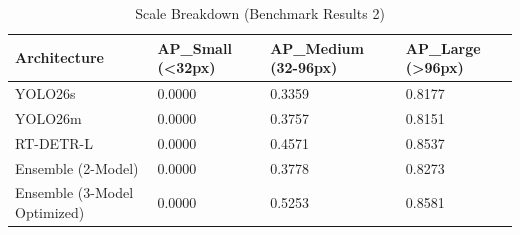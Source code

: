 \begin{table}
\caption{Scale Breakdown (Benchmark Results 2)}
\label{tab:scale_sensitivity_2}
\begin{tabular}{llll}
\toprule
Architecture & AP_Small (<32px) & AP_Medium (32-96px) & AP_Large (>96px) \\
\midrule
YOLO26s & 0.0000 & 0.3359 & 0.8177 \\
YOLO26m & 0.0000 & 0.3757 & 0.8151 \\
RT-DETR-L & 0.0000 & 0.4571 & 0.8537 \\
Ensemble (2-Model) & 0.0000 & 0.3778 & 0.8273 \\
Ensemble (3-Model Optimized) & 0.0000 & 0.5253 & 0.8581 \\
\bottomrule
\end{tabular}
\end{table}
